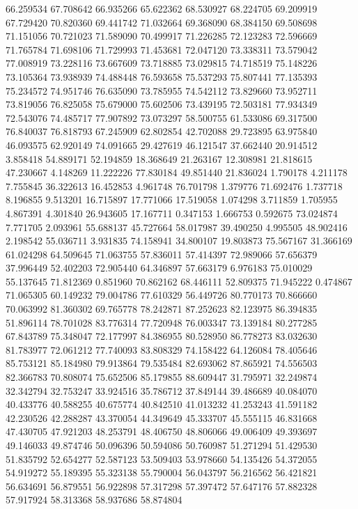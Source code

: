 66.259534
67.708642
66.935266
65.622362
68.530927
68.224705
69.209919
67.729420
70.820360
69.441742
71.032664
69.368090
68.384150
69.508698
71.151056
70.721023
71.589090
70.499917
71.226285
72.123283
72.596669
71.765784
71.698106
71.729993
71.453681
72.047120
73.338311
73.579042
77.008919
73.228116
73.667609
73.718885
73.029815
74.718519
75.148226
73.105364
73.938939
74.488448
76.593658
75.537293
75.807441
77.135393
75.234572
74.951746
76.635090
73.785955
74.542112
73.829660
73.952711
73.819056
76.825058
75.679000
75.602506
73.439195
72.503181
77.934349
72.543076
74.485717
77.907892
73.073297
58.500755
61.533086
69.317500
76.840037
76.818793
67.245909
62.802854
42.702088
29.723895
63.975840
46.093575
62.920149
74.091665
29.427619
46.121547
37.662440
20.914512
3.858418
54.889171
52.194859
18.368649
21.263167
12.308981
21.818615
47.230667
4.148269
11.222226
77.830184
49.851440
21.836024
1.790178
4.211178
7.755845
36.322613
16.452853
4.961748
76.701798
1.379776
71.692476
1.737718
8.196855
9.513201
16.715897
17.771066
17.519058
1.074298
3.711859
1.705955
4.867391
4.301840
26.943605
17.167711
0.347153
1.666753
0.592675
73.024874
7.771705
2.093961
55.688137
45.727664
58.017987
39.490250
4.995505
48.902416
2.198542
55.036711
3.931835
74.158941
34.800107
19.803873
75.567167
31.366169
61.024298
64.509645
71.063755
57.836011
57.414397
72.989066
57.656379
37.996449
52.402203
72.905440
64.346897
57.663179
6.976183
75.010029
55.137645
71.812369
0.851960
70.862162
68.446111
52.809375
71.945222
0.474867
71.065305
60.149232
79.004786
77.610329
56.449726
80.770173
70.866660
70.063992
81.360302
69.765778
78.242871
87.252623
82.123975
86.394835
51.896114
78.701028
83.776314
77.720948
76.003347
73.139184
80.277285
67.843789
75.348047
72.177997
84.386955
80.528950
86.778273
83.032630
81.783977
72.061212
77.740093
83.808329
74.158422
64.126084
78.405646
85.753121
85.184980
79.913864
79.535484
82.693062
87.865921
74.556503
82.366783
70.808074
75.652506
85.179855
88.609447
31.795971
32.249874
32.342794
32.753247
33.924516
35.786712
37.849144
39.486689
40.084070
40.433776
40.588255
40.675774
40.842510
41.013232
41.253243
41.591182
42.230526
42.288287
43.370054
44.349649
45.333707
45.555115
46.831668
47.430705
47.921203
48.253791
48.406750
48.806066
49.006409
49.393697
49.146033
49.874746
50.096396
50.594086
50.760987
51.271294
51.429530
51.835792
52.654277
52.587123
53.509403
53.978660
54.135426
54.372055
54.919272
55.189395
55.323138
55.790004
56.043797
56.216562
56.421821
56.634691
56.879551
56.922898
57.317298
57.397472
57.647176
57.882328
57.917924
58.313368
58.937686
58.874804
